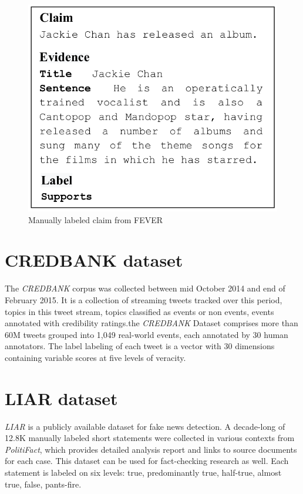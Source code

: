 \documentclass[10pt, english]{report}
\begin{document}
\begin{figure}[H]
	\centering
	\includegraphics[scale=0.3]{img/fever_example.png}
	\caption{Manually labeled claim from FEVER}
\end{figure}

\section{CREDBANK dataset \cite{mitra2015credbank}}
The \textit{CREDBANK} corpus was collected between mid October 2014 and end of February 2015. It is a collection of streaming tweets tracked over this period, topics in this tweet stream, topics classified as events or non events, events annotated with credibility ratings.the \textit{CREDBANK} Dataset comprises more than 60M tweets grouped into 1,049 real-world events, each annotated by 30 human annotators. The label labeling of each tweet is a vector with 30 dimensions containing variable scores at five levels of veracity.

\section{LIAR dataset \cite{wang2017liar}}
\textit{LIAR} is a publicly available dataset for fake news detection. A decade-long of 12.8K manually labeled short statements were collected in various contexts from \textit{PolitiFact}, which provides detailed analysis report and links to source documents for each case. This dataset can be used for fact-checking research as well. Each statement is labeled on six levels: true, predominantly true, half-true, almost true, false, pants-fire.
\end{document}
